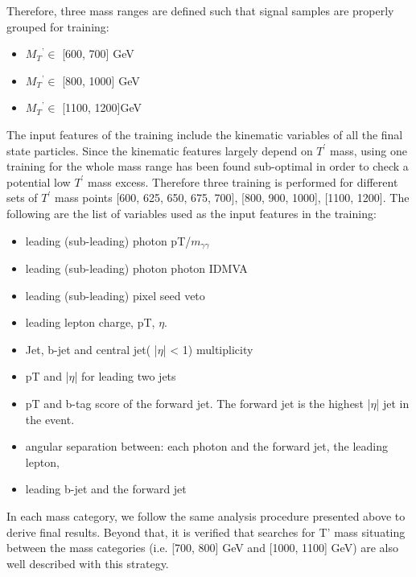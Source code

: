 Therefore, three mass ranges are defined such that signal samples are properly grouped for training:
\begin{itemize}
    \item $M_T{^’} \in$ [600, 700] GeV
    \item $M_T{^’} \in$ [800, 1000] GeV
    \item $M_T{^’}   \in$ [1100, 1200]GeV
\end{itemize}


The input features of the training include the kinematic variables of all the final state particles. Since the kinematic features largely depend on $T^'$ mass, using one training for the whole mass range has been found sub-optimal in order to check a potential low $T^'$  mass excess. Therefore three training is performed for different sets of $T^'$  mass points [600, 625, 650, 675, 700], [800, 900, 1000], [1100, 1200]. The following are the list of variables used as the input features in the
training:
\begin{itemize}
    \item leading (sub-leading) photon pT/$m_{\gamma\gamma}$
    \item leading (sub-leading) photon photon IDMVA
    \item leading (sub-leading) pixel seed veto
    \item leading lepton charge, pT, $\eta$.
    \item Jet, b-jet and central jet( |$\eta$| < 1) multiplicity
    \item pT and |$\eta$| for leading two jets
    \item pT and b-tag score of the forward jet. The forward jet is the highest |$\eta$| jet in the event.
    \item angular separation between: each photon and the forward jet, the leading lepton,
\item leading b-jet and the forward jet
\end{itemize}


In each mass category, we follow the same analysis procedure presented above to derive final results. Beyond that, it is verified that searches for T’ mass situating between the mass categories (i.e. [700, 800] GeV and [1000, 1100] GeV) are also well described with this strategy.






